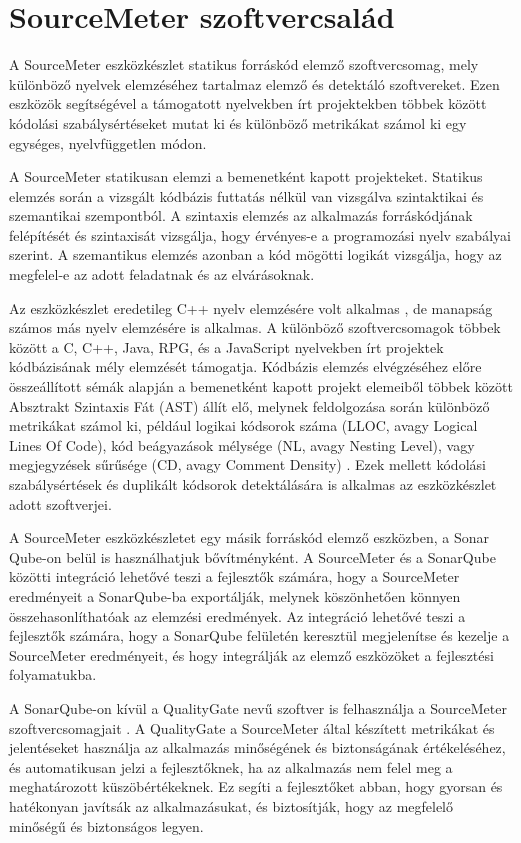 \chapter{SourceMeter szoftvercsalád}
\label{chap:fejezet2}

A SourceMeter eszközkészlet statikus forráskód elemző szoftvercsomag, mely különböző nyelvek elemzéséhez tartalmaz elemző és detektáló szoftvereket. Ezen eszközök segítségével a támogatott nyelvekben írt projektekben többek között kódolási szabálysértéseket mutat ki és különböző metrikákat számol ki egy egységes, nyelvfüggetlen módon.

A SourceMeter statikusan elemzi a bemenetként kapott projekteket. 
Statikus elemzés során a vizsgált kódbázis futtatás nélkül van vizsgálva szintaktikai és szemantikai szempontból. A szintaxis elemzés az alkalmazás forráskódjának felépítését és szintaxisát vizsgálja, hogy érvényes-e a programozási nyelv szabályai szerint. A szemantikus elemzés azonban a kód mögötti logikát vizsgálja, hogy az megfelel-e az adott feladatnak és az elvárásoknak. 

Az eszközkészlet eredetileg C++ nyelv elemzésére volt alkalmas \cite{1167764}, de manapság számos más nyelv elemzésére is alkalmas. A különböző szoftvercsomagok többek között a C, C++, Java, RPG, és a JavaScript nyelvekben írt projektek kódbázisának mély elemzését támogatja.
Kódbázis elemzés elvégzéséhez előre összeállított sémák alapján a bemenetként kapott projekt elemeiből többek között Absztrakt Szintaxis Fát (AST) állít elő, melynek feldolgozása során különböző metrikákat számol ki, például logikai kódsorok száma (LLOC, avagy Logical Lines Of Code), kód beágyazások mélysége (NL, avagy Nesting Level), vagy megjegyzések sűrűsége (CD, avagy Comment Density) \cite{siket2014differences}. Ezek mellett kódolási szabálysértések és duplikált kódsorok detektálására is alkalmas az eszközkészlet adott szoftverjei.

A SourceMeter eszközkészletet egy másik forráskód elemző eszközben, a Sonar Qube-on belül is használhatjuk bővítményként. A SourceMeter és a SonarQube közötti integráció lehetővé teszi a fejlesztők számára, hogy a SourceMeter eredményeit a SonarQube-ba exportálják, melynek köszönhetően könnyen összehasonlíthatóak az elemzési eredmények. Az integráció lehetővé teszi a fejlesztők számára, hogy a SonarQube felületén keresztül megjelenítse és kezelje a SourceMeter eredményeit, és hogy integrálják az elemző eszközöket a fejlesztési folyamatukba.

A SonarQube-on kívül a QualityGate nevű szoftver is felhasználja a SourceMeter szoftvercsomagjait \cite{6747214}. A QualityGate a SourceMeter által készített metrikákat és jelentéseket használja az alkalmazás minőségének és biztonságának értékeléséhez, és automatikusan jelzi a fejlesztőknek, ha az alkalmazás nem felel meg a meghatározott küszöbértékeknek. Ez segíti a fejlesztőket abban, hogy gyorsan és hatékonyan javítsák az alkalmazásukat, és biztosítják, hogy az megfelelő minőségű és biztonságos legyen.

